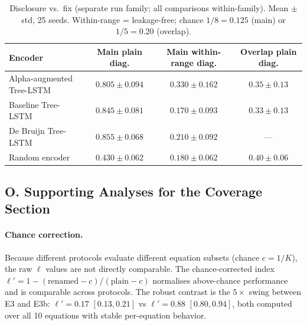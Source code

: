 \begin{table}[t]
\centering
\caption{Disclosure vs.\ fix (separate run family; all comparisons within-family). Mean $\pm$ std, 25 seeds. Within-range = leakage-free; chance $1/8{=}0.125$ (main) or $1/5{=}0.20$ (overlap).}
\label{tab:alpha_rename}
\setlength{\tabcolsep}{4pt}
\begin{tabular}{l ccc}
\toprule
Encoder & Main plain diag. & Main within-range diag. & Overlap plain diag. \\
\midrule
Alpha-augmented Tree-LSTM & $0.805 \pm 0.094$ & $0.330 \pm 0.162$ & $0.35 \pm 0.13$ \\
Baseline Tree-LSTM        & $0.845 \pm 0.081$ & $0.170 \pm 0.093$ & $0.33 \pm 0.13$ \\
De Bruijn Tree-LSTM       & $0.855 \pm 0.068$ & $0.210 \pm 0.092$ & --- \\
Random encoder            & $0.430 \pm 0.062$ & $0.180 \pm 0.062$ & $0.40 \pm 0.06$ \\
\bottomrule
\end{tabular}
\end{table}

\subsection*{O. Supporting Analyses for the Coverage Section}

\paragraph{Chance correction.} Because different protocols evaluate different equation subsets (chance $c{=}1/K$), the raw $\ell$ values are not directly comparable. The chance-corrected index $\ell' = 1 - (\text{renamed} - c)/(\text{plain} - c)$ normalises above-chance performance and is comparable across protocols. The robust contrast is the $5\times$ swing between E3 and E3b: $\ell'{=}0.17$ $[0.13, 0.21]$ vs $\ell'{=}0.88$ $[0.80, 0.94]$, both computed over all 10 equations with stable per-equation behavior.

